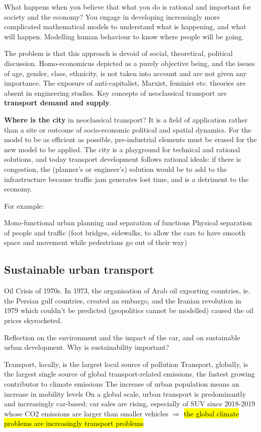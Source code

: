 \documentclass{article}
\begin{document}
What happens when you believe that what you do is rational and important for society and the economy? You engage in developing increasingly more complicated mathematical models to understand what is happening, and what will happen. Modelling human behaviour to know where people will be going. 

The problem is that this approach is devoid of social, theoretical, political discussion. Homo-economicus depicted as a purely objective being, and the issues of age, gender, class, ethnicity, is not taken into account and are not given any importance. The exposure of anti-capitalist, Marxist, feminist etc. theories are absent in engineering studies.
Key concepts of neoclassical transport are \textbf{transport demand and supply}.

\textbf{Where is the city} in neoclassical transport? It is a field of application rather than a site or outcome of socio-economic political and spatial dynamics. For the model to be as efficient as possible, pre-industrial elements must be erased for the new model to be applied. The city is a playground for technical and rational solutions, and today transport development follows rational ideals: if there is congestion, the (planner's or engineer's) solution would be to add to the infrastructure because traffic jam generates lost time, and is a detriment to the economy. 

For example:

\begin{outline}
	\1 Mono-functional urban planning and separation of functions
	\1 Physical separation of people and traffic (foot bridges, sidewalks, to allow the cars to have smooth space and movement while pedestrians go out of their way)
\end{outline}

\subsection{Sustainable urban transport}

Oil Crisis of 1970s. In 1973, the organisation of Arab oil exporting countries, ie. the Persian gulf countries, created an embargo, and the Iranian revolution in 1979 which couldn't be predicted (geopolitics cannot be modelled) caused the oil prices skyrocketed.

Reflection on the environment and the impact of the car, and on sustainable urban development. Why is sustainability important?

\begin{outline}
	\1 Transport, locally, is the largest local source of pollution
	\1 Transport, globally, is the largest single source of global transport-related emissions, the fastest growing contributor to climate emissions
	\1 The increase of urban population means an increase in mobility levels
	\1 On a global scale, urban transport is predominantly and increasingly car-based; car sales are rising, especially of SUV since 2018-2019 whose CO2 emissions are larger than smaller vehicles
	\1 $\Rightarrow$ \hl{the global climate problems are increasingly transport problems}
\end{outline}
 
\end{document}
